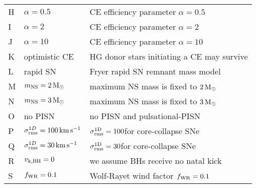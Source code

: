 \begin{table}
\begin{tabular}{|l|l|l|}
%
H       &$\alpha=0.5$	                   				&  CE efficiency parameter $\alpha = 0.5$ \\%
%
I        & $\alpha=2$		                  				& CE efficiency parameter $\alpha = 2$ \\%
%
J       &$\alpha=10$	                   				&  CE efficiency parameter $\alpha = 10$ \\%
%
K      	& optimistic CE	    		& HG donor stars initiating a CE may survive\\%
%
\hline
%
%
L       & rapid SN	                  				& Fryer rapid {SN} remnant mass model \\%
%
M       & $m_{\rm{NS}} = 2\,\rm{M}_{\odot}$	                				& maximum NS mass is fixed to $2\,\rm{M}_{\odot}$\\%
%
N        & $m_{\rm{NS}} = 3\,\rm{M}_{\odot}$		               				& maximum NS mass is fixed to $3\,\rm{M}_{\odot}$\\%
%
O       & no PISN		                  				& no  PISN and pulsational-PISN\\%
%
P      	 & $\sigma_{\rm{rms}}^{1D} =100\,\rm{km}\,\rm{s}^{-1}$ 	                				& $\sigma_{\rm{rms}}^{\rm{1D}}=100$\kms  	for core-collapse {SNe}\\%
%
Q        & $\sigma_{\rm{rms}}^{1D} =30\,\rm{km}\,\rm{s}^{-1}$ 	               				& $\sigma_{\rm{rms}}^{\rm{1D}}=30$\kms  	for core-collapse {SNe} \\%
%
R       & $v_{\rm{k,BH}} = 0$	                 				& we assume \acp{BH} receive no natal kick\\%
%
\hline
%
S        &  $f_{\rm{WR}}=0.1$	               				& Wolf-Rayet wind factor $f_{\rm{WR}} = 0.1$ \\%

\end{tabular}
\end{table}
